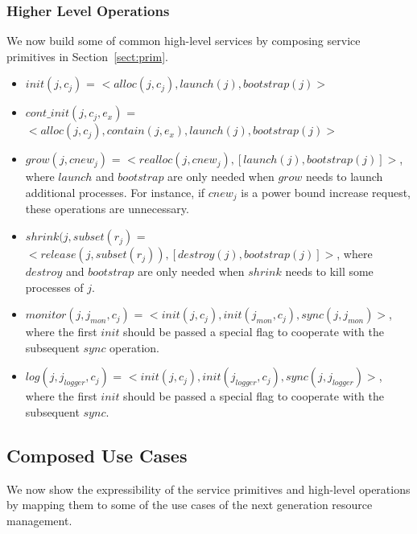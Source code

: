 \subsubsection{Higher Level Operations}
\label{sect:hiop}
We now build some of common high-level services
by composing service primitives in Section~\ref{sect:prim}.

\begin{itemize}

\item{$init(j, c_j)$ = $<alloc(j, c_j), launch(j), bootstrap(j)>$}

\item{$cont\_init(j, c_j, e_x)$ = $< alloc(j, c_j), contain(j, e_x), launch(j), bootstrap(j) >$}

\item{$grow(j, cnew_j)$ = $<realloc(j, cnew_j), [launch(j), bootstrap(j)]>$,  where $launch$ and $bootstrap$ are only needed when $grow$ needs to launch additional processes. For instance, if $cnew_j$ is a power bound increase request, these operations are unnecessary.}

\item{$shrink(j,subset(r_j)$ = $<release(j, subset(r_j)), [destroy(j), bootstrap(j)]>$, where $destroy$ and $bootstrap$ are only needed when $shrink$ needs to kill some processes of $j$.}

\item{$monitor(j, j_{mon}, c_j)$ = $<init(j, c_j), init(j_{mon}, c_j), sync(j, j_{mon})>$, where the first $init$ should be passed a special flag to cooperate with the subsequent $sync$ operation.}

\item{$log(j, j_{logger}, c_j)$ = $<init(j, c_j), init(j_{logger}, c_j), sync(j, j_{logger})>$, where the first $init$ should be passed a special flag to cooperate with the subsequent $sync$.}

\end{itemize}

\subsection{Composed Use Cases}
We now show the expressibility of the service primitives and
high-level operations by mapping them to some of the
use cases of the next generation resource management.

